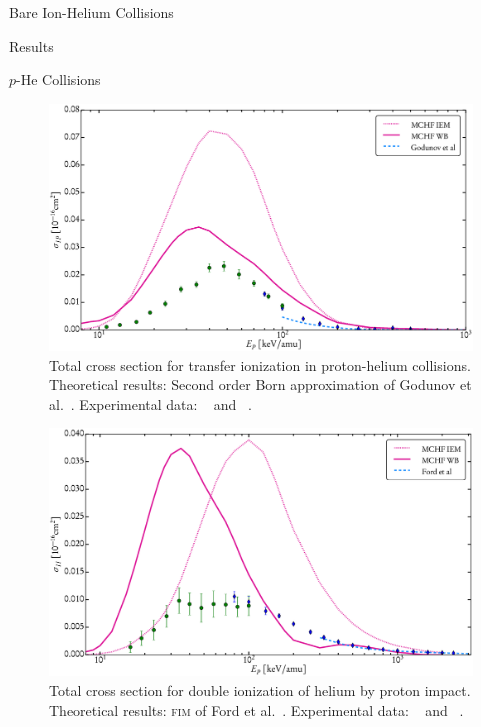 \documentclass[a5paper, 9 pt]{extreport}
\begin{document}
\begin{chapter}{Bare Ion-Helium Collisions \label{chap:p-he2p-he}}
\begin{section}{Results \label{sec:phe2p-res}}
\begin{subsection}{\texorpdfstring{$p$}{p}-He Collisions \label{sec:phe-res}}
         \begin{figure}[t]
            \centering
            \includegraphics[width = 0.95 \linewidth]{./images/phe/phe-IP.eps}
            \caption[Total cross section for transfer ionization in proton-helium collisions.]
                    {Total cross section for transfer ionization in proton-helium collisions.
                     Theoretical results: Second order Born approximation of Godunov
                     et al.~\cite{Godunov-06}. Experimental data:
                     {\color{OliveGreen}{$\bullet$}}~\cite{SG89} and
                     {\color{blue}{$\blacklozenge$}}~\cite{SG85}. \label{fig:phe-ip}}
         \end{figure}

         \begin{figure}[t]
            \centering
            \includegraphics[width = 0.95 \linewidth]{./images/phe/phe-II.eps}
            \caption[Total cross section for double ionization of helium by proton impact.]
                    {Total cross section for double ionization of helium by proton impact.
                     Theoretical results: \textsc{fim} of Ford et al.~\cite{FR-94}.
                     Experimental data: {\color{OliveGreen}{$\bullet$}}~\cite{SG89} and
                     {\color{blue}{$\blacklozenge$}}~\cite{SG85}. \label{fig:phe-ii}}
         \end{figure}


\end{subsection}
\end{section}
\end{chapter}
\end{document}
